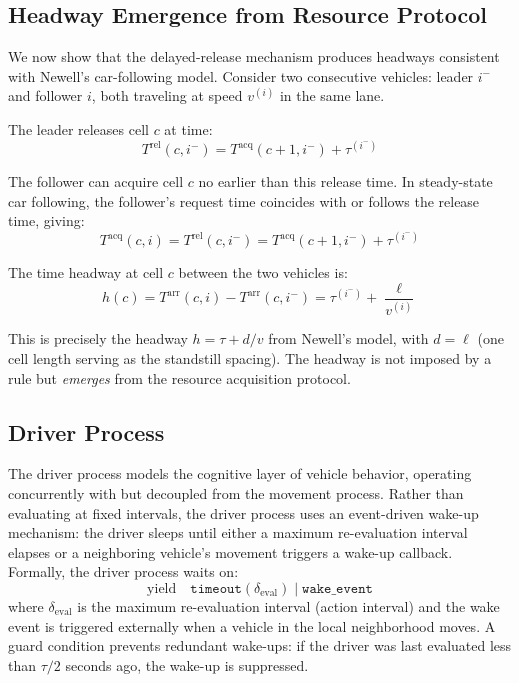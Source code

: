 \documentclass[review,authoryear]{elsarticle}
\newcommand{\Tacq}{T^{\text{acq}}}
\newcommand{\Tarr}{T^{\text{arr}}}
\newcommand{\Trel}{T^{\text{rel}}}
\begin{document}
\subsection{Headway Emergence from Resource Protocol}
\label{sec:headway}

We now show that the delayed-release mechanism produces headways consistent with Newell's car-following model. Consider two consecutive vehicles: leader $i^{-}$ and follower $i$, both traveling at speed $v^{(i)}$ in the same lane.

The leader releases cell $c$ at time:
\begin{equation}
    \Trel(c, i^{-}) = \Tacq(c+1, i^{-}) + \tau^{(i^{-})}
\end{equation}

The follower can acquire cell $c$ no earlier than this release time. In steady-state car following, the follower's request time coincides with or follows the release time, giving:
\begin{equation}
    \Tacq(c, i) = \Trel(c, i^{-}) = \Tacq(c+1, i^{-}) + \tau^{(i^{-})}
\end{equation}

The time headway at cell $c$ between the two vehicles is:
\begin{equation}
    h(c) = \Tarr(c, i) - \Tarr(c, i^{-}) = \tau^{(i^{-})} + \frac{\ell}{v^{(i)}}
    \label{eq:headway}
\end{equation}

This is precisely the headway $h = \tau + d/v$ from Newell's model, with $d = \ell$ (one cell length serving as the standstill spacing). The headway is not imposed by a rule but \emph{emerges} from the resource acquisition protocol.

\subsection{Driver Process}
\label{sec:driver}

The driver process models the cognitive layer of vehicle behavior, operating concurrently with but decoupled from the movement process. Rather than evaluating at fixed intervals, the driver process uses an event-driven wake-up mechanism: the driver sleeps until either a maximum re-evaluation interval elapses or a neighboring vehicle's movement triggers a wake-up callback. Formally, the driver process waits on:
\begin{equation}
    \text{yield} \quad \texttt{timeout}(\delta_{\text{eval}}) \;\big|\; \texttt{wake\_event}
    \label{eq:driver_yield}
\end{equation}
where $\delta_{\text{eval}}$ is the maximum re-evaluation interval (action interval) and the wake event is triggered externally when a vehicle in the local neighborhood moves. A guard condition prevents redundant wake-ups: if the driver was last evaluated less than $\tau/2$ seconds ago, the wake-up is suppressed.
\end{document}
